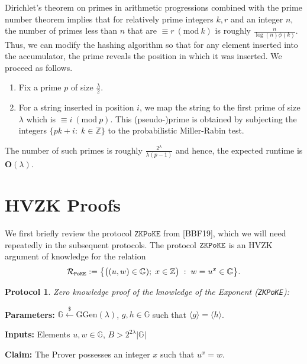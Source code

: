 \documentclass[11pt, lettersize, notitlepage, leqno, footskip=0.6cm]{article}
\newcommand{\bz}{\mathbb Z}
\newcommand{\ttt}{\texttt}
\newcommand{\bG}{\mathbb{G}}
\newcommand{\la}{\langle}
\newcommand{\ra}{\rangle}
\newcommand{\mc}{\mathcal}
\newcommand{\mb}{\mathbb}
\newcommand{\mbf}{\mathbf}
\newcommand{\mr}{\mathrm}
\newcommand{\lam}{\lambda}
\newcommand{\lamb}{\lambda}
\newcommand{\vs}{\vspace{-0.15cm}}
\newcommand{\noin}{\noindent}
\newcommand{\Mod}[1]{\ (\mathrm{mod}\ #1)}
\newtheorem{Prot}[Thm]{Protocol}
\numberwithin{equation}{section}
\begin{document}
Dirichlet's theorem on primes in arithmetic progressions combined with the prime number theorem implies that for relatively prime integers $k,r$ and an integer $n$, the number of primes less than $n$ that are $\equiv r\Mod{k}$ is roughly $\frac{n}{\log(n)\phi(k)}$. Thus, we can modify the hashing algorithm so that for any element inserted into the accumulator, the prime reveals the position in which it was inserted. We proceed as follows.\begin{enumerate}[wide, labelwidth=!, labelindent=0pt]\vspace{-0.1cm} 

\item Fix a prime $p$ of size $\frac{\lam}{2}$. \vs 

\item For a string inserted in position $i$, we map the string to the first prime of size $\lam$ which is $\equiv i\Mod{p}$. This (pseudo-)prime is obtained by subjecting the integers $\{pk+i:\;k\in\bz\}$ to the probabilistic Miller-Rabin test. \end{enumerate} 

\noin The number of such primes is roughly \vs $\frac{2^{\lam}}{\lam (p-1)}$ and hence, the expected runtime is $\mbf{O}(\lam)$.

\section{\fontsize{11}{11}\selectfont HVZK Proofs}

We first briefly review the protocol $\ttt{ZKPoKE}$ from [BBF19], which we will need repeatedly in the subsequent protocols. The protocol $\tt{ZKPoKE}$ is an HVZK argument of knowledge for the relation \vs $$\mc{R}_{\tt{PoKE}}:= \big\{\big((u,w)\in \bG);\; x\in \bz\big)\;:\; w = u^x \in \bG  \big\}.$$

\begin{Prot} \normalfont \hypertarget{ZKPoKE}{\textit{Zero knowledge proof of the knowledge of the Exponent}} (\verb|ZKPoKE|):\end{Prot} \vspace{-0.3cm}

\noin \textbf{Parameters:} $\mb{G}\xleftarrow{\$} \mr{GGen}(\lamb)$,  $g,h\in \mb{G}$ such that $\la g \ra = \la h \ra$.

\noin \textbf{Inputs:} Elements $u,w \in \mb{G}$, $B > 2^{2\lam}|\bG|$

\noin \textbf{Claim:} The Prover possesses an integer $x$ such that $u^x = w$.
\end{document}
